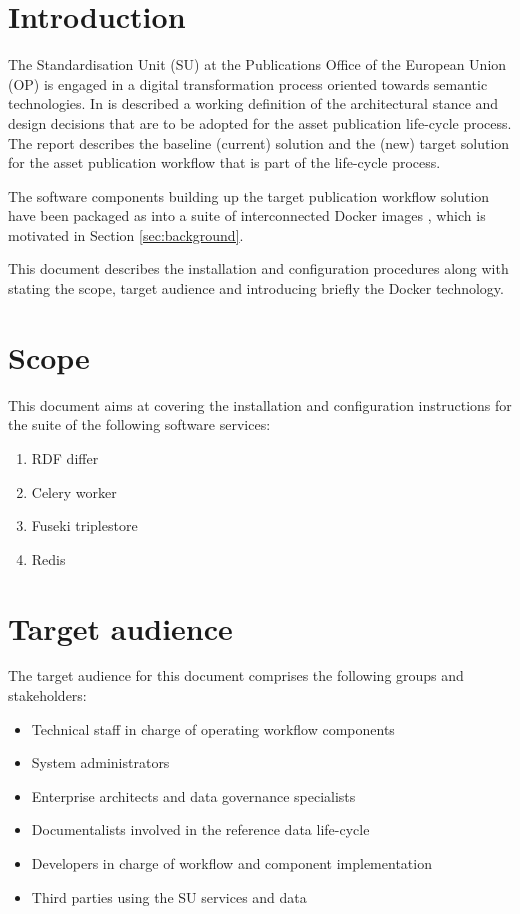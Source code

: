 \section{Introduction}
\label{sec:introduction}	

    The Standardisation Unit (SU) at the Publications Office of the European Union (OP) is engaged in a digital transformation process oriented towards semantic technologies. In \citep{costetchi2020d} is described a working definition of the architectural stance and design decisions that are to be adopted for the asset publication life-cycle process. The report describes the baseline (current) solution and the (new) target solution for the asset publication workflow that is part of the life-cycle process. 
    
    The software components building up the target publication workflow solution have been packaged as into a suite of interconnected Docker images \citep{docker-merkel2014docker}, which is motivated in Section \ref{sec:background}.
    
    This document describes the installation and configuration procedures along with stating the scope, target audience and introducing briefly the Docker technology.
    
\section{Scope}
\label{sec:scope}

	This document aims at covering the installation and configuration instructions for the suite of the following software services:
	
	\begin{enumerate}
		\item RDF differ
		\item Celery worker
		\item Fuseki triplestore \cite{fuseki}
		\item Redis
	\end{enumerate}

\section{Target audience}
\label{sec:audience}
	
	The target audience for this document comprises the following groups and stakeholders:	
	\begin{itemize}
		\item Technical staff in charge of operating workflow components
		\item System administrators
		\item Enterprise architects and data governance specialists
		\item Documentalists involved in the reference data life-cycle
		\item Developers in charge of workflow and component implementation
		\item Third parties using the SU services and data 
	\end{itemize}	
		
